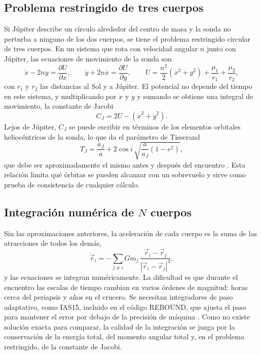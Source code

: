 \documentclass[12pt,letterpaper]{article}
\begin{document}
\subsection{Problema restringido de tres cuerpos}

Si Júpiter describe un círculo alrededor del centro de masa y la sonda no perturba a ninguno
de los dos cuerpos, se tiene el problema restringido circular de tres cuerpos. En un sistema
que rota con velocidad angular $n$ junto con Júpiter, las ecuaciones de movimiento de la sonda
son
\begin{equation}
\ddot x - 2n\dot y = \frac{\partial U}{\partial x}, \qquad
\ddot y + 2n\dot x = \frac{\partial U}{\partial y}, \qquad
U = \frac{n^2}{2}(x^2+y^2) + \frac{\mu_1}{r_1} + \frac{\mu_2}{r_2},
\end{equation}
con $r_1$ y $r_2$ las distancias al Sol y a Júpiter. El potencial no depende del tiempo en
este sistema, y multiplicando por $\dot x$ y $\dot y$ y sumando se obtiene una integral de
movimiento, la constante de Jacobi
\begin{equation}
C_J = 2U - (\dot x^2 + \dot y^2).
\end{equation}
Lejos de Júpiter, $C_J$ se puede escribir en términos de los elementos orbitales
heliocéntricos de la sonda, lo que da el parámetro de Tisserand
\begin{equation}
T_J = \frac{a_J}{a} + 2\cos i\,\sqrt{\frac{a}{a_J}\left(1-e^2\right)} ,
\end{equation}
que debe ser aproximadamente el mismo antes y después del encuentro \cite{murray1999}. Esta
relación limita qué órbitas se pueden alcanzar con un sobrevuelo y sirve como prueba de
consistencia de cualquier cálculo.

\subsection{Integración numérica de $N$ cuerpos}

Sin las aproximaciones anteriores, la aceleración de cada cuerpo es la suma de las
atracciones de todos los demás,
\begin{equation}
\ddot{\vec r}_i = -\sum_{j\neq i} G m_j\,\frac{\vec r_i - \vec r_j}{|\vec r_i - \vec r_j|^3},
\end{equation}
y las ecuaciones se integran numéricamente. La dificultad es que durante el encuentro las
escalas de tiempo cambian en varios órdenes de magnitud: horas cerca del periapsis y años en
el crucero. Se necesitan integradores de paso adaptativo, como IAS15, incluido en el código
REBOUND, que ajusta el paso para mantener el error por debajo de la precisión de máquina
\cite{rein2012,rein2015}. Como no existe solución exacta para comparar, la calidad de la
integración se juzga por la conservación de la energía total, del momento angular total y,
en el problema restringido, de la constante de Jacobi.
\end{document}
